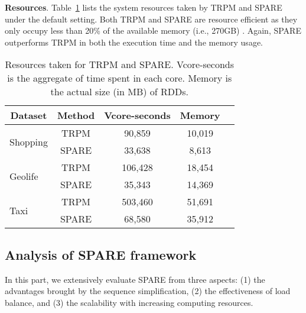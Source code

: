 \textbf{Resources}. Table~\ref{tbl:resource} lists the system resources taken 
by TRPM and SPARE under the default setting. Both TRPM and SPARE are 
resource efficient as they only occupy less than 20\% 
of the available memory (i.e., 270GB) . Again, SPARE outperforms TRPM in both the execution time and the memory usage.


\begin{table}[h]
\centering
\caption{Resources taken for TRPM and SPARE. Vcore-seconds is the aggregate of time spent in each core. Memory is the actual size (in MB) of RDDs.}
\label{tbl:resource}
\begin{tabular}{|l|c|c|c|c|}
\hline
\multicolumn{1}{|c|}{\textbf{Dataset}} & \textbf{Method} 
& \textbf{Vcore-seconds} & \textbf{Memory} \\ \hline
\multirow{2}{*}{Shopping}              & TRPM           
                               & 90,859                 & 10,019               \\ 
                                       & SPARE           
                                                                      & 33,638                 & 8,613                \\ \hline
\multirow{2}{*}{Geolife}               & TRPM            
                              & 106,428                & 18,454               \\
                                       & SPARE            
                                                                     & 35,343                 & 14,369               \\ \hline
\multirow{2}{*}{Taxi}                  & TRPM            
                           & 503,460                & 51,691               \\ 
                                       & SPARE           
                                                                    & 68,580                & 35,912               \\ \hline
\end{tabular}
\end{table}

\subsection{Analysis of SPARE framework}
In this part, we extensively evaluate SPARE from three aspects:
(1) the advantages brought by the sequence simplification, (2) the effectiveness of load balance, and (3) the scalability with increasing computing resources.


